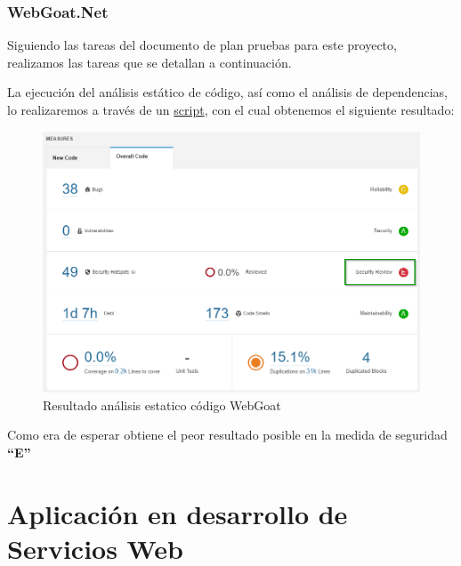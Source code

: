 \subsubsection{WebGoat.Net}
Siguiendo las tareas del documento de plan pruebas para este proyecto, realizamos las tareas que se detallan a continuación.

La ejecución del análisis estático de código, así como el análisis de dependencias, lo realizaremos a través de un 
\href{https://github.com/M0l1n3ta/PFG/blob/master/Scripts/STAT/RunSonarScaner_WebGoat.NET.ps1}{script}, con el cual obtenemos
el siguiente resultado:
\begin{figure}[h!]  
    \includegraphics[width=\linewidth]{./imagenes/10_AnalisisEstatico_WebGoat.Net.png}
    \caption{Resultado análisis estatico código WebGoat}  
    \label{fig:9}
\end{figure}
Como era de esperar obtiene el peor resultado posible en la medida de seguridad \textbf{“E”}

\section{Aplicación en desarrollo de Servicios Web} 

